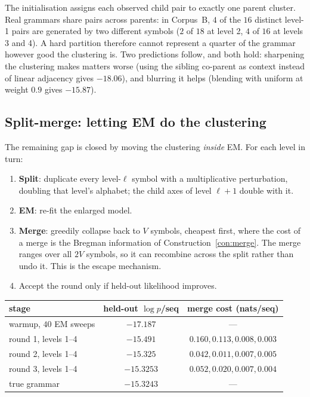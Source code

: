 \documentclass[11pt,a4paper]{article}
\theoremstyle{plain}
\theoremstyle{definition}
\begin{document}
The initialisation assigns each observed child pair to exactly one parent
cluster. Real grammars share pairs across parents: in Corpus~B, $4$ of the $16$
distinct level-1 pairs are generated by two different symbols ($2$ of $18$ at
level 2, $4$ of $16$ at levels 3 and 4). A hard partition therefore cannot
represent a quarter of the grammar however good the clustering is. Two
predictions follow, and both hold: sharpening the clustering makes matters
worse (using the sibling co-parent as context instead of linear adjacency gives
$-18.06$), and blurring it helps (blending with uniform at weight $0.9$ gives
$-15.87$).

\subsection{Split-merge: letting EM do the clustering}

The remaining gap is closed by moving the clustering \emph{inside} EM. For each
level in turn:

\begin{enumerate}
\item \textbf{Split}: duplicate every level-$\ell$ symbol with a multiplicative
perturbation, doubling that level's alphabet; the child axes of level $\ell+1$
double with it.
\item \textbf{EM}: re-fit the enlarged model.
\item \textbf{Merge}: greedily collapse back to $V$ symbols, cheapest first,
where the cost of a merge is the Bregman information of
Construction~\ref{con:merge}. The merge ranges over all $2V$ symbols, so it can
recombine across the split rather than undo it. This is the escape mechanism.
\item Accept the round only if held-out likelihood improves.
\end{enumerate}

\begin{center}
\begin{tabular}{lcc}
\toprule
stage & held-out $\log p$/seq & merge cost (nats/seq) \\
\midrule
warmup, $40$ EM sweeps        & $-17.187$ & --- \\
round 1, levels 1--4          & $-15.491$ & $0.160, 0.113, 0.008, 0.003$ \\
round 2, levels 1--4          & $-15.325$ & $0.042, 0.011, 0.007, 0.005$ \\
round 3, levels 1--4          & $-15.3253$ & $0.052, 0.020, 0.007, 0.004$ \\
\midrule
true grammar                  & $\mathbf{-15.3243}$ & --- \\
\bottomrule
\end{tabular}
\end{center}
\end{document}
